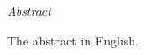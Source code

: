 \vfill
\begin{center}
{\it \large Abstract}
\vspace{0.2cm}

\begin{minipage}{0.8\textwidth}{
The abstract in English. 
}
\end{minipage}
\end{center}
\vfill
\vspace{1cm}
